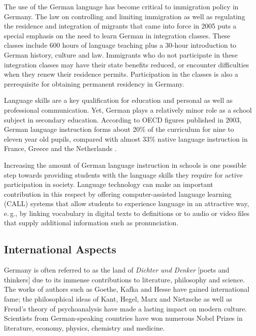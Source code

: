\begin{multicols}{2}
The use of the German language has become critical to immigration policy in Germany. The law on controlling and limiting immigration as well as regulating the residence and integration of migrants that came into force in 2005 puts a special emphasis on the need to learn German in integration classes. These classes include 600 hours of language teaching plus a 30-hour introduction to German history, culture and law. Immigrants who do not participate in these integration classes may have their state benefits reduced, or encounter difficulties when they renew their residence permits. Participation in the classes is also a prerequisite for obtaining permanent residency in Germany.

Language skills are a key qualification for education and personal as well as professional communication. Yet, German plays a relatively minor role as a school subject in secondary education. According to OECD figures published in 2003, German language instruction forms about 20\% of the curriculum for nine to eleven year old pupils, compared with almost 33\% native language instruction in France, Greece and the Netherlands \cite{kmk1}.


Increasing the amount of German language instruction in schools is one possible step towards providing students with the language skills they require for active participation in society. Language technology can make an important contribution in this respect by offering computer-assisted language learning (CALL) systems that allow students to experience language in an attractive way, e.\,g., by linking vocabulary in digital texts to definitions or to audio or video files that supply additional information such as pronunciation.

\subsection{International Aspects}

Germany is often referred to as the land of \textit{Dichter und Denker} [poets and thinkers] due to its immense contributions to literature, philosophy and science. The works of authors such as Goethe, Kafka and Hesse have gained international fame; the philosophical ideas of Kant, Hegel, Marx and Nietzsche as well as Freud's theory of psychoanalysis have made a lasting impact on modern culture. Scientists from German-speaking countries have won numerous Nobel Prizes in literature, economy, physics, chemistry and medicine.


\end{multicols}
